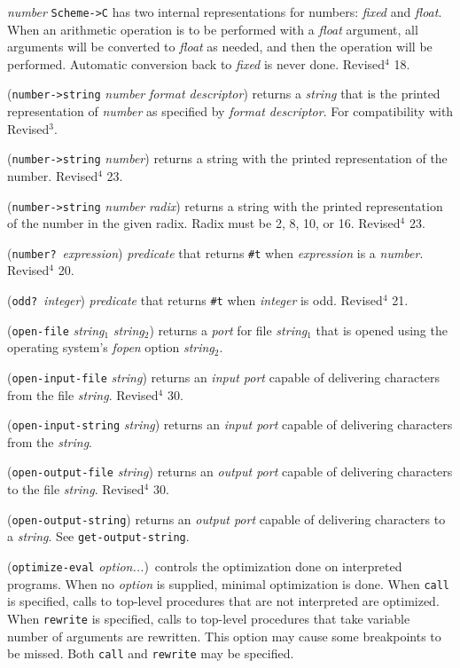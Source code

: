 \documentclass[10pt,twocolumn]{article}
\begin{document}
\emph{number} \texttt{Scheme->C} has two internal representations for numbers:
\emph{fixed} and \emph{float}.  When an arithmetic operation is to
be performed with a \emph{float} argument, all arguments will be
converted to \emph{float} as needed, and then the operation will be
performed.  Automatic conversion back to \emph{fixed} is never done.
Revised$^4$ 18. 

(\texttt{number->string} \emph{number} \emph{format descriptor}) returns a
\emph{string} that is the printed representation of \emph{number} as
specified by \emph{format descriptor}.  For compatibility with
Revised$^3$.

(\texttt{number->string} \emph{number}) returns a string with the printed
representation of the number.  Revised$^4$ 23.

(\texttt{number->string} \emph{number} \emph{radix}) returns a string with the
printed representation of the number in the given radix.  Radix must
be 2, 8, 10, or 16.  Revised$^4$ 23.

(\texttt{number?}\ \emph{expression}) \emph{predicate} that returns \texttt{\#t} when
\emph{expression} is a \emph{number}.  Revised$^4$ 20.

(\texttt{odd?}\ \emph{integer}) \emph{predicate} that returns \texttt{\#t} when
\emph{integer} is odd.  Revised$^4$ 21.

(\texttt{open-file} \emph{string}$_1$ \emph{string}$_2$) returns a \emph{port}
for file \emph{string}$_1$ that is opened using the operating
system's \emph{fopen} option  \emph{string}$_2$.

(\texttt{open-input-file} \emph{string}) returns an \emph{input port} capable of
delivering characters from the file \emph{string}.  Revised$^4$ 30.

(\texttt{open-input-string} \emph{string})  returns an \emph{input port} capable
of delivering characters from the \emph{string}.

(\texttt{open-output-file} \emph{string}) returns an \emph{output port} capable
of delivering characters to the file \emph{string}.  Revised$^4$ 30.

(\texttt{open-output-string}) returns an \emph{output port} capable of
delivering characters to a \emph{string}.  See \texttt{get-output-string}.

(\texttt{optimize-eval} \emph{option...})\ controls the optimization done on
interpreted programs.  When no \emph{option} is supplied, minimal optimization
is done.  When \texttt{call} is specified, calls to top-level procedures that
are not interpreted are optimized.  When \texttt{rewrite} is
specified, calls to top-level procedures that take variable
number of arguments are rewritten.  This option may cause some
breakpoints to be missed.  Both \texttt{call} and \texttt{rewrite} may
be specified.
\end{document}
